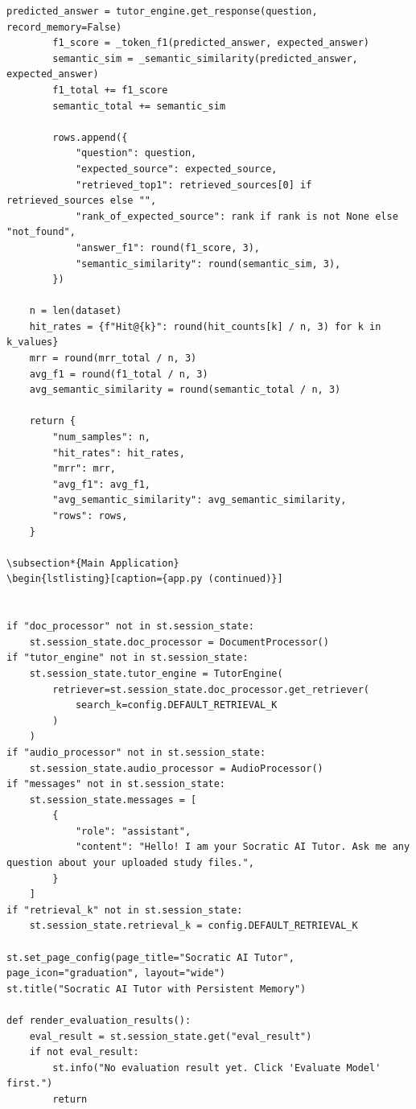 \documentclass[12pt,a4paper]{article}
\begin{document}
\begin{lstlisting}[caption={evaluation.py}]
        predicted_answer = tutor_engine.get_response(question, record_memory=False)
        f1_score = _token_f1(predicted_answer, expected_answer)
        semantic_sim = _semantic_similarity(predicted_answer, expected_answer)
        f1_total += f1_score
        semantic_total += semantic_sim

        rows.append({
            "question": question,
            "expected_source": expected_source,
            "retrieved_top1": retrieved_sources[0] if retrieved_sources else "",
            "rank_of_expected_source": rank if rank is not None else "not_found",
            "answer_f1": round(f1_score, 3),
            "semantic_similarity": round(semantic_sim, 3),
        })

    n = len(dataset)
    hit_rates = {f"Hit@{k}": round(hit_counts[k] / n, 3) for k in k_values}
    mrr = round(mrr_total / n, 3)
    avg_f1 = round(f1_total / n, 3)
    avg_semantic_similarity = round(semantic_total / n, 3)

    return {
        "num_samples": n,
        "hit_rates": hit_rates,
        "mrr": mrr,
        "avg_f1": avg_f1,
        "avg_semantic_similarity": avg_semantic_similarity,
        "rows": rows,
    }

\subsection*{Main Application}
\begin{lstlisting}[caption={app.py (continued)}]


if "doc_processor" not in st.session_state:
    st.session_state.doc_processor = DocumentProcessor()
if "tutor_engine" not in st.session_state:
    st.session_state.tutor_engine = TutorEngine(
        retriever=st.session_state.doc_processor.get_retriever(
            search_k=config.DEFAULT_RETRIEVAL_K
        )
    )
if "audio_processor" not in st.session_state:
    st.session_state.audio_processor = AudioProcessor()
if "messages" not in st.session_state:
    st.session_state.messages = [
        {
            "role": "assistant",
            "content": "Hello! I am your Socratic AI Tutor. Ask me any question about your uploaded study files.",
        }
    ]
if "retrieval_k" not in st.session_state:
    st.session_state.retrieval_k = config.DEFAULT_RETRIEVAL_K

st.set_page_config(page_title="Socratic AI Tutor", page_icon="graduation", layout="wide")
st.title("Socratic AI Tutor with Persistent Memory")

def render_evaluation_results():
    eval_result = st.session_state.get("eval_result")
    if not eval_result:
        st.info("No evaluation result yet. Click 'Evaluate Model' first.")
        return


\end{lstlisting}
\end{document}
